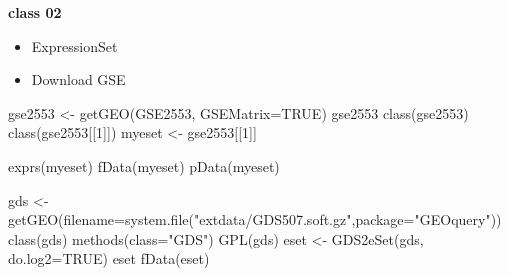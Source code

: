 \documentclass[
]{book}
\newenvironment{Shaded}{\begin{snugshade}}{\end{snugshade}}
\newcommand{\AttributeTok}[1]{\textcolor[rgb]{0.77,0.63,0.00}{#1}}
\newcommand{\ConstantTok}[1]{\textcolor[rgb]{0.00,0.00,0.00}{#1}}
\newcommand{\DecValTok}[1]{\textcolor[rgb]{0.00,0.00,0.81}{#1}}
\newcommand{\FunctionTok}[1]{\textcolor[rgb]{0.00,0.00,0.00}{#1}}
\newcommand{\NormalTok}[1]{#1}
\newcommand{\OtherTok}[1]{\textcolor[rgb]{0.56,0.35,0.01}{#1}}
\newcommand{\SpecialCharTok}[1]{\textcolor[rgb]{0.00,0.00,0.00}{#1}}
\newcommand{\StringTok}[1]{\textcolor[rgb]{0.31,0.60,0.02}{#1}}
\providecommand{\tightlist}{%
  \setlength{\itemsep}{0pt}\setlength{\parskip}{0pt}}
\begin{document}
\textbf{class 02}

\begin{itemize}
\tightlist
\item
  ExpressionSet
\end{itemize}

\begin{Shaded}
\end{Shaded}

\begin{itemize}
\tightlist
\item
  Download GSE
\end{itemize}

\begin{Shaded}
\begin{Highlighting}[]
\NormalTok{gse2553 }\OtherTok{\textless{}{-}} \FunctionTok{getGEO}\NormalTok{(}\StringTok{\textquotesingle{}GSE2553\textquotesingle{}}\NormalTok{, }\AttributeTok{GSEMatrix=}\ConstantTok{TRUE}\NormalTok{)}
\NormalTok{gse2553}
\FunctionTok{class}\NormalTok{(gse2553)}
\FunctionTok{class}\NormalTok{(gse2553[[}\DecValTok{1}\NormalTok{]])}
\NormalTok{myeset }\OtherTok{\textless{}{-}}\NormalTok{ gse2553[[}\DecValTok{1}\NormalTok{]]}

\FunctionTok{exprs}\NormalTok{(myeset)}
\FunctionTok{fData}\NormalTok{(myeset)}
\FunctionTok{pData}\NormalTok{(myeset)}
\end{Highlighting}
\end{Shaded}

\begin{Shaded}
\begin{Highlighting}[]
\NormalTok{gds }\OtherTok{\textless{}{-}} \FunctionTok{getGEO}\NormalTok{(}\AttributeTok{filename=}\FunctionTok{system.file}\NormalTok{(}\StringTok{"extdata/GDS507.soft.gz"}\NormalTok{,}\AttributeTok{package=}\StringTok{"GEOquery"}\NormalTok{))}
\FunctionTok{class}\NormalTok{(gds)}
\FunctionTok{methods}\NormalTok{(}\AttributeTok{class=}\StringTok{"GDS"}\NormalTok{)}
\FunctionTok{GPL}\NormalTok{(gds)}
\NormalTok{eset }\OtherTok{\textless{}{-}} \FunctionTok{GDS2eSet}\NormalTok{(gds, }\AttributeTok{do.log2=}\ConstantTok{TRUE}\NormalTok{)}
\NormalTok{eset}
\FunctionTok{fData}\NormalTok{(eset)}
\end{Highlighting}
\end{Shaded}
\end{document}
